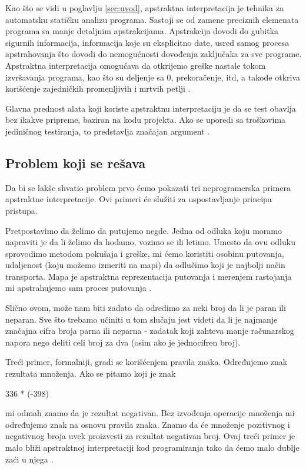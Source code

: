 Kao što se vidi u poglavlju \ref{sec:uvod}, apstraktna interpretacija je tehnika za automatsku statičku analizu programa. Sastoji se od zamene preciznih elemenata programa sa manje detaljnim apstrakcijama. Apstrakcija dovodi do gubitka sigurnih informacija, informacija koje su eksplicitno date, usred samog procesa apstrahovanja što dovodi do nemogućnosti dovođenja zaključaka za sve programe. Apstraktna interpretacija omogućava da otkrijemo greške nastale tokom izvršavanja programa, kao što su deljenje sa 0, prekoračenje, itd, a takođe otkriva korišćenje zajedničkih promenljivih i mrtvih petlji \cite{AbramskyHankin}. 

Glavna prednost alata koji koriste apstraktnu interpretaciju je da se test obavlja bez ikakve pripreme, baziran na kodu projekta. Ako se uporedi sa troškovima jediničnog testiranja, to predstavlja značajan argument \cite{AbramskyHankin}. 


\subsection{Problem koji se rešava}
\label{subsec:problem1}
Da bi se lakše shvatio problem prvo ćemo pokazati tri neprogramerska primera apstraktne interpretacije. Ovi primeri će služiti za uspostavljanje principa pristupa. 

Pretpostavimo da želimo da putujemo negde. Jedna od odluka koju moramo napraviti je da li želimo da hodamo, vozimo se ili letimo. Umesto da ovu odluku sprovodimo metodom pokušaja i greške, mi ćemo koristiti osobinu putovanja, udaljenost (koju možemo izmeriti na mapi) da odlučimo koji je najbolji način transporta. Mapa je apstraktna reprezentacija putovanja i merenjem rastojanja mi apstrahujemo sam proces putovanja \cite{AbramskyHankin}. 

Slično ovom, može nam biti zadato da odredimo za neki broj da li je paran ili neparan. Sve što trebamo učiniti u tom slučaju jest videti da li je najmanje značajna cifra broja parna ili neparna - zadatak koji
zahteva manje računarskog napora nego deliti celi broj za dva (osim ako je jednocifren broj). 


Treći primer, formalniji, gradi se korišćenjem pravila znaka. Određujemo znak rezultata množenja. Ako se pitamo koji je znak

336 * (-398)  

mi odmah znamo da je rezultat negativan. Bez izvođenja operacije množenja mi određujemo znak na osnovu pravila znaka. Znamo da će množenje pozitivnog i negativnog broja uvek proizvesti za rezultat negativan broj. Ovaj treći primer je malo bliži apstraktnoj interpretaciji kod programiranja tako da ćemo malo dublje zaći u njega \cite{AbramskyHankin}. 

